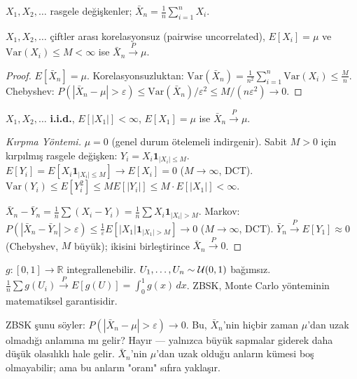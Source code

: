 \begin{tanim}
$X_1, X_2, \ldots$ rasgele değişkenler; $\bar{X}_n = \frac{1}{n}\sum_{i=1}^n X_i$.
\end{tanim}

\begin{teorem}
\label{thm:chebyshev_zbsk}
$X_1, X_2, \ldots$ çiftler arası korelasyonsuz (pairwise uncorrelated),
$E[X_i] = \mu$ ve $\mathrm{Var}(X_i) \leq M < \infty$ ise
$\bar{X}_n \xrightarrow{P} \mu$.
\end{teorem}

\begin{proof}
$E[\bar{X}_n] = \mu$. Korelasyonsuzluktan:
$\mathrm{Var}(\bar{X}_n) = \frac{1}{n^2}\sum_{i=1}^n \mathrm{Var}(X_i) \leq \frac{M}{n}$.
Chebyshev: $P(|\bar{X}_n - \mu| > \varepsilon) \leq \mathrm{Var}(\bar{X}_n)/\varepsilon^2 \leq M/(n\varepsilon^2) \to 0$.
\end{proof}

\begin{teorem}
\label{thm:zbsk_genel}
$X_1, X_2, \ldots$ \textbf{i.i.d.}, $E[|X_1|] < \infty$, $E[X_1] = \mu$ ise
$\bar{X}_n \xrightarrow{P} \mu$.
\end{teorem}

\begin{proof}[Kırpma Yöntemi]
$\mu = 0$ (genel durum ötelemeli indirgenir). Sabit $M > 0$ için kırpılmış rasgele değişken:
$Y_i = X_i \mathbf{1}_{|X_i| \leq M}$.
$E[Y_i] = E[X_i \mathbf{1}_{|X_i|\leq M}] \to E[X_i] = 0$ ($M\to\infty$, DCT).
$\mathrm{Var}(Y_i) \leq E[Y_i^2] \leq ME[|Y_i|] \leq M \cdot E[|X_1|] < \infty$.

$\bar{X}_n - \bar{Y}_n = \frac{1}{n}\sum(X_i - Y_i) = \frac{1}{n}\sum X_i \mathbf{1}_{|X_i|>M}$.
Markov: $P(|\bar{X}_n - \bar{Y}_n| > \varepsilon) \leq \frac{1}{\varepsilon}E[|X_1|\mathbf{1}_{|X_1|>M}] \to 0$
($M\to\infty$, DCT).
$\bar{Y}_n \xrightarrow{P} E[Y_1] \approx 0$ (Chebyshev, $M$ büyük); ikisini birleştirince $\bar{X}_n \xrightarrow{P} 0$.
\end{proof}

\begin{ornek}
$g : [0,1] \to \mathbb{R}$ integrallenebilir. $U_1, \ldots, U_n \sim \mathcal{U}(0,1)$ bağımsız.
$\frac{1}{n}\sum g(U_i) \xrightarrow{P} E[g(U)] = \int_0^1 g(x)\,dx$.
ZBSK, Monte Carlo yönteminin matematiksel garantisidir.
\end{ornek}

\begin{kritiksorgu}
ZBSK şunu söyler: $P(|\bar{X}_n - \mu| > \varepsilon) \to 0$.
Bu, $\bar{X}_n$'nin hiçbir zaman $\mu$'dan uzak olmadığı anlamına mı gelir?
Hayır --- yalnızca büyük sapmalar giderek daha düşük olasılıklı hale gelir.
$\bar{X}_n$'nin $\mu$'dan uzak olduğu anların kümesi boş olmayabilir;
ama bu anların "oranı" sıfıra yaklaşır.
\end{kritiksorgu}

